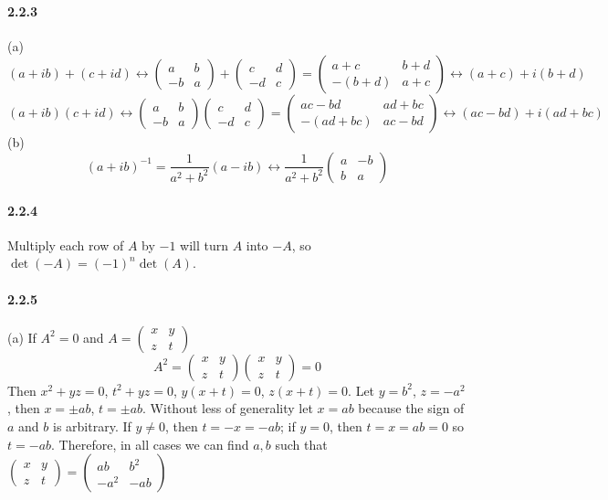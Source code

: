 \documentclass[a4paper]{article}
\begin{document}
\paragraph{2.2.3}
(a)
\renewcommand{\arraystretch}{1}
\[(a+ib)+(c+id)\longleftrightarrow
\begin{pmatrix}
a&b\\-b&a
\end{pmatrix}+
\begin{pmatrix}
c&d\\-d&c
\end{pmatrix}=
\begin{pmatrix}
a+c&b+d\\-(b+d)&a+c
\end{pmatrix}\longleftrightarrow
(a+c)+i(b+d)
\]
\[(a+ib)(c+id)\longleftrightarrow
\begin{pmatrix}
a&b\\-b&a
\end{pmatrix}
\begin{pmatrix}
c&d\\-d&c
\end{pmatrix}=
\begin{pmatrix}
ac-bd&ad+bc\\-(ad+bc)&ac-bd
\end{pmatrix}\longleftrightarrow
(ac-bd)+i(ad+bc)
\]
(b)
\[(a+ib)^{-1}=\frac{1}{a^2+b^2}(a-ib)\longleftrightarrow\frac{1}{a^2+b^2}
\begin{pmatrix}
a&-b\\b&a
\end{pmatrix}
\]

\paragraph{2.2.4}
Multiply each row of $A$ by $-1$ will turn $A$ into $-A$, so $\det(-A)=(-1)^n\det(A)$.

\paragraph{2.2.5}
(a) If $A^2=0$ and $A=\begin{pmatrix}
x&y\\z&t
\end{pmatrix}$
\[A^2=
\begin{pmatrix}
x&y\\z&t
\end{pmatrix}
\begin{pmatrix}
x&y\\z&t
\end{pmatrix}=0
\]
Then $x^2+yz=0$, $t^2+yz=0$, $y(x+t)=0$, $z(x+t)=0$. Let $y=b^2$, $z=-a^2$, then $x=\pm ab$, $t=\pm ab$. Without less of generality let $x=ab$ because the sign of $a$ and $b$ is arbitrary. If $y\neq0$, then $t=-x=-ab$; if $y=0$, then $t=x=ab=0$ so $t=-ab$. Therefore, in all cases we can find $a,b$ such that $\begin{pmatrix}
x&y\\z&t
\end{pmatrix}=\begin{pmatrix}
ab&b^2\\-a^2&-ab
\end{pmatrix}$
\end{document}
